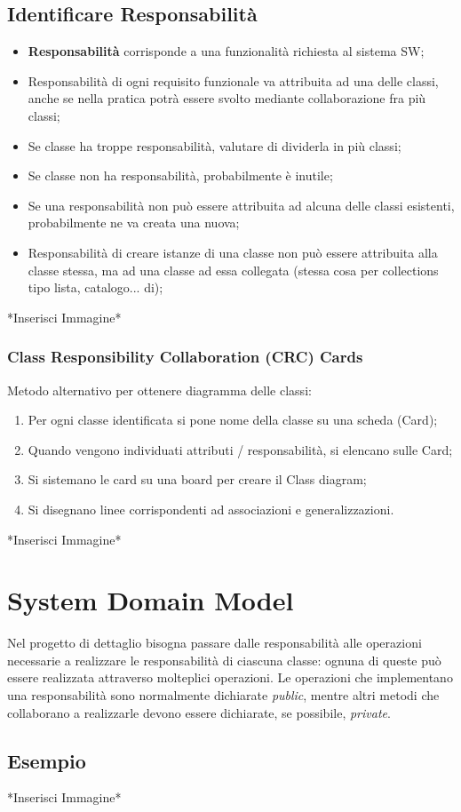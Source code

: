 \documentclass{article}
\begin{document}
    \subsection{Identificare Responsabilità}
      \begin{itemize}
        \item \textbf{Responsabilità} corrisponde a una funzionalità richiesta al sistema SW; 
        \item Responsabilità di ogni requisito funzionale va attribuita ad una delle classi, anche se nella pratica potrà essere svolto mediante collaborazione fra più classi; 
        \item Se classe ha troppe responsabilità, valutare di dividerla in più classi;
        \item Se classe non ha responsabilità, probabilmente è inutile;
        \item Se una responsabilità non può essere attribuita ad alcuna delle classi esistenti, probabilmente ne va creata una nuova; 
        \item Responsabilità di creare istanze di una classe non può essere attribuita alla classe stessa, ma ad una classe ad essa collegata (stessa cosa per collections tipo lista, catalogo... di); 
      \end{itemize}
      *Inserisci Immagine*
      \subsubsection{Class Responsibility Collaboration (CRC) Cards}
        Metodo alternativo per ottenere diagramma delle classi:
        \begin{enumerate}
          \item Per ogni classe identificata si pone nome della classe su una scheda (Card);
          \item Quando vengono individuati attributi / responsabilità, si elencano sulle Card;
          \item Si sistemano le card su una board per creare il Class diagram;
          \item Si disegnano linee corrispondenti ad associazioni e generalizzazioni.
        \end{enumerate}
        *Inserisci Immagine*
  \section{System Domain Model}
    Nel progetto di dettaglio bisogna passare dalle responsabilità alle operazioni necessarie a realizzare le responsabilità di ciascuna classe: ognuna di queste può essere realizzata attraverso molteplici operazioni. Le operazioni che implementano una responsabilità sono normalmente dichiarate \textit{public}, mentre altri metodi che collaborano a realizzarle devono essere dichiarate, se possibile, \textit{private}. 
    \subsection{Esempio}
    *Inserisci Immagine*
\end{document}
